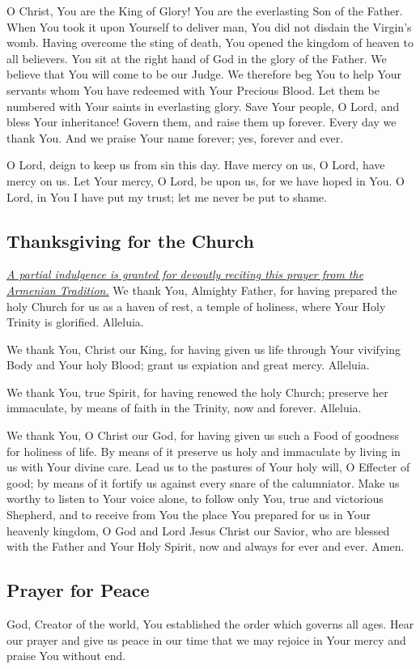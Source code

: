 \documentclass[12pt]{article}
\newcommand{\prayertitle}[1]{\subsection{#1}}
\newcommand{\indulgencedprayertitle}[1]{\prayertitle{#1 \protect\kreuz}}
\newcommand{\note}[1]{{\small{\textsl{#1}}}\newline}
\newcommand{\linkednote}[2]{\hyperlink{#1}{\note{#2}}}
\begin{document}
O Christ, You are the King of Glory!
You are the everlasting Son of the Father.
When You took it upon Yourself to deliver man, You did not disdain the Virgin's womb.
Having overcome the sting of death, You opened the kingdom of heaven to all believers.
You sit at the right hand of God in the glory of the Father.
We believe that You will come to be our Judge.
We therefore beg You to help Your servants whom You have redeemed with Your Precious Blood.
Let them be numbered with Your saints in everlasting glory.
Save Your people, O Lord, and bless Your inheritance!
Govern them, and raise them up forever.
Every day we thank You.
And we praise Your name forever;
yes, forever and ever.

O Lord, deign to keep us from sin this day.
Have mercy on us, O Lord, have mercy on us.
Let Your mercy, O Lord, be upon us, for we have hoped in You.
O Lord, in You I have put my trust;
let me never be put to shame.

\indulgencedprayertitle{Thanksgiving for the Church}
\linkednote{grant23}{A partial indulgence is granted for devoutly reciting this prayer from the Armenian Tradition.}
We thank You, Almighty Father, for having prepared the holy Church for us as a haven
of rest, a temple of holiness, where Your Holy Trinity is glorified. Alleluia.

We thank You, Christ our King, for having given us life through Your vivifying Body
and Your holy Blood; grant us expiation and great mercy. Alleluia.

We thank You, true Spirit, for having renewed the holy Church; preserve her immaculate, by means of faith in the Trinity, now and forever. Alleluia.

We thank You, O Christ our God, for having given us such a Food of goodness for
holiness of life.
By means of it preserve us holy and immaculate by living in us with Your divine care.
Lead us to the pastures of Your holy will, O Effecter of good; by means of it fortify us against every snare of the calumniator.
Make us worthy to listen to Your voice alone, to follow only You, true and victorious Shepherd, and to receive from You the place You prepared for us in Your heavenly kingdom, O God and Lord Jesus Christ our Savior, who are blessed with the Father and Your Holy Spirit, now and always for ever and ever.
Amen.

\prayertitle{Prayer for Peace}
God, Creator of the world, You established the order which governs all ages.
Hear our prayer and give us peace in our time that we may rejoice in Your mercy and praise You without end.
\end{document}

